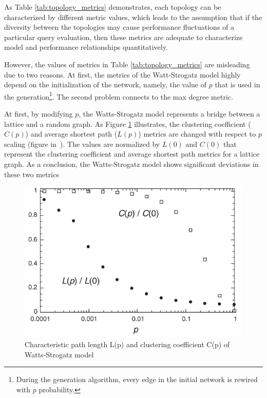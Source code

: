 As Table \ref{tab:topology_metrics} demonstrates, each topology can be characterized by different metric values, which leads to the assumption that if the diversity between the topologies may cause performance fluctuations of a particular query evaluation, then these metrics are adequate to characterize model and performance relationships quantitatively.


However, the values of metrics in Table \ref{tab:topology_metrics} are misleading due to two reasons. At first, the metrics of the Watt-Strogatz model highly depend on the initialization of the network, namely, the value of $p$ that is used in the generation\footnote{During the generation algorithm, every edge in the initial network is rewired with $p$ probability.}. The second problem connects to the max degree metric.  

At first, by modifying $p$, the Watts-Strogatz model represents a bridge between a lattice and a random graph. As Figure \ref{fig:ws} illustrates, the clustering coefficient ($C(p)$) and average shortest path ($L(p)$) metrics are changed with respect to $p$ scaling (figure in~\cite{ws_metrics}). The values are normalized by $L(0)$ and $C(0)$ that represent the clustering coefficient and average shortest path metrics for a lattice graph. As a conclusion, the Watts-Strogatz model shows significant deviations in these two metrics

\begin{figure}[!ht]
	\centering
	\includegraphics[width=130mm, keepaspectratio]{figures/ws_metrics.png}
	\caption{Characteristic path length L(p) and clustering coefficient C(p) of Watts-Strogatz model}
	\label{fig:ws}
\end{figure}

